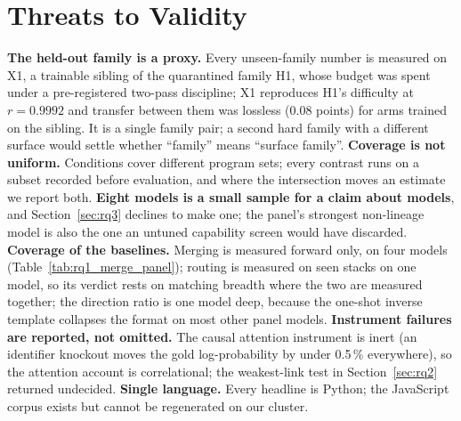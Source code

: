 \section{Threats to Validity}

\textbf{The held-out family is a proxy.} Every unseen-family number is measured on X1, a trainable
sibling of the quarantined family H1, whose budget was spent under a pre-registered two-pass
discipline; X1 reproduces H1's difficulty at $r = 0.9992$ and transfer between them was lossless
(0.08 points) for arms trained on the sibling. It is a single family pair; a second hard family with
a different surface would settle whether ``family'' means ``surface family''. \textbf{Coverage is not
uniform.} Conditions cover different program sets; every contrast runs on a subset recorded before
evaluation, and where the intersection moves an estimate we report both. \textbf{Eight models is a
small sample for a claim about models}, and Section~\ref{sec:rq3} declines to make one; the panel's
strongest non-lineage model is also the one an untuned capability screen would have discarded.
\textbf{Coverage of the baselines.} Merging is measured forward only, on four models
(Table~\ref{tab:rq1_merge_panel}); routing is measured on seen stacks on one model, so its verdict
rests on matching breadth where the two are measured together; the direction ratio is one model deep,
because the one-shot inverse template collapses the format on most other panel models.
\textbf{Instrument failures are reported, not omitted.} The causal attention instrument is inert (an
identifier knockout moves the gold log-probability by under 0.5\,\% everywhere), so the attention
account is correlational; the weakest-link test in Section~\ref{sec:rq2} returned undecided.
\textbf{Single language.} Every headline is Python; the JavaScript corpus exists but cannot be
regenerated on our cluster.
